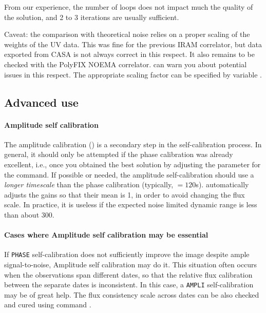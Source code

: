 From our experience, the number of loops  does not impact 
much the quality of the solution, and 2 to 3 iterations are usually 
sufficient.


Caveat: the comparison with theoretical noise relies on a proper 
scaling of the weights of the UV data. This was fine for the previous
IRAM correlator, but data exported from CASA is not always correct in this respect.
It also remains to be checked with the PolyFIX NOEMA correlator. 
 can warn you about potential issues in this respect. 
The appropriate scaling factor can be specified by variable .

\subsection{Advanced use}

\paragraph{Amplitude self calibration}
The amplitude calibration () is a secondary step in the self-calibration process.
In general, it should only be attempted if the phase calibration was 
already excellent, i.e., once you obtained the best solution by 
adjusting the  parameter for the 
 command. If possible or needed, the amplitude 
self-calibration should use a \textit{longer timescale} than the phase 
calibration (typically, $=120$s).  
automatically adjusts the gains so that their mean is 1, in order to 
avoid changing the flux scale. In practice, it is useless if the expected noise
limited dynamic range is less than about 300.

\paragraph{Cases where Amplitude self calibration may be essential}
If \texttt{PHASE} self-calibration does not sufficiently improve the image
despite ample signal-to-noise, Amplitude self calibration may do it. 
This situation often occurs when the observations span different dates,
so that the relative flux calibration between the separate dates is 
inconsistent. In this case, a \texttt{AMPLI} self-calibration may
be of great help. The flux consistency scale across dates can be
also checked and cured using command .
 

